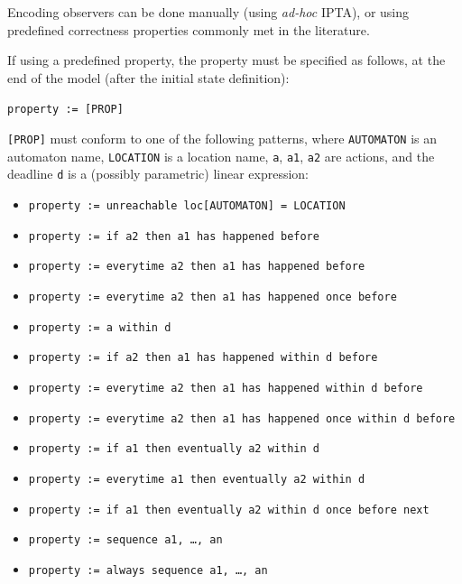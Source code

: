 \documentclass[a4paper,11pt]{report}
\newcommand{\IPTA}{IPTA}
\newcommand{\styleIMI}[1]{\textcolor{imicolor}{\texttt{#1}}}
\newcommand{\adhoc}{\textcolor{colorok}{\textit{ad-hoc} }} %
\begin{document}
Encoding observers can be done manually (using \adhoc{} \IPTA{}), or using predefined correctness properties commonly met in the literature.

If using a predefined property, the property must be specified as follows, at the end of the model (after the initial state definition):

\styleIMI{property := [PROP]}

\styleIMI{[PROP]} must conform to one of the following patterns, where \styleIMI{AUTOMATON} is an automaton name, \styleIMI{LOCATION} is a location name, \styleIMI{a}, \styleIMI{a1}, \styleIMI{a2} are actions, and the deadline \styleIMI{d} is a (possibly parametric) linear expression:

\begin{itemize}
	\item \styleIMI{property := unreachable loc[AUTOMATON] = LOCATION}
	\item \styleIMI{property := if a2 then a1 has happened before}
	\item \styleIMI{property := everytime a2 then a1 has happened before}
	\item \styleIMI{property := everytime a2 then a1 has happened once before}
	\item \styleIMI{property := a within d}
	\item \styleIMI{property := if a2 then a1 has happened within d before}
	\item \styleIMI{property := everytime a2 then a1 has happened within d before}
	\item \styleIMI{property := everytime a2 then a1 has happened once within d before}
	\item \styleIMI{property := if a1 then eventually a2 within d}
	\item \styleIMI{property := everytime a1 then eventually a2 within~d}
	\item \styleIMI{property := if a1 then eventually a2 within d once before next}
	\item \styleIMI{property := sequence a1, \dots, an}
	\item \styleIMI{property := always sequence a1, \dots, an}
\end{itemize}
\end{document}

